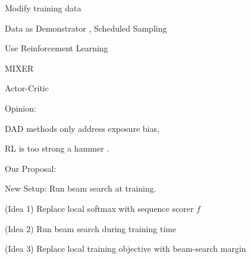 \documentclass{beamer}
\let\tempone\itemize
\let\temptwo\enditemize
\renewenvironment{itemize}{\tempone\addtolength{\itemsep}{0.5\baselineskip}}{\temptwo}
\newcommand{\air}{\vspace{0.25cm}}
\newcommand{\Cite}[1]{{\footnotesize \citep{#1}}}
\begin{document}
\begin{frame}
  \centerline{ Modify training data}
  \air 
  \begin{itemize}
  \item Data as Demonstrator \Cite{Venkatraman}, Scheduled Sampling \Cite{Bengio2015}
  \end{itemize}
  \air 

  \centerline{ Use Reinforcement Learning}
  \air 
  \begin{itemize}
  \item MIXER \Cite{Ranzato2016}
  \item Actor-Critic \Cite{Bahdanau2016}
  \end{itemize}
  
  \pause

  Opinion: 
  \begin{itemize}
  \item 
    DAD methods only address exposure bias, 
  \item RL is too strong a hammer .
  \end{itemize}

\end{frame}


\begin{frame}
  \begin{center}
    Our Proposal: 
  \end{center}

  New Setup: Run beam search at training. 
  \air 

  
  \begin{itemize}

  \item (Idea 1) Replace local softmax with sequence scorer $f$
    \air 
  \item (Idea 2) Run beam search during training time 
    \air 

  \item (Idea 3) Replace local training objective with beam-search margin
  \end{itemize}
\end{frame}
\end{document}
